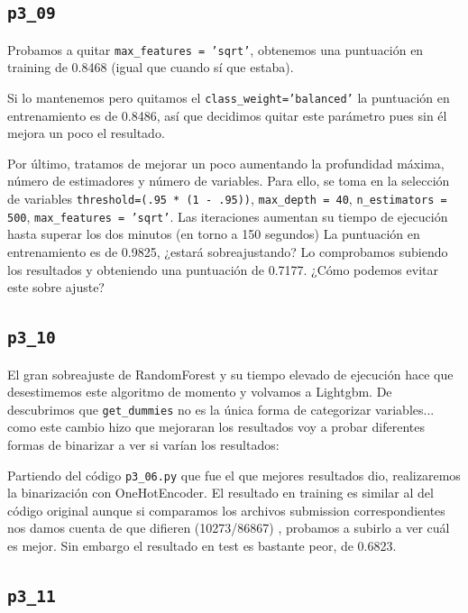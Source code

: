 \documentclass[a4paper, 20pt]{article}
\begin{document}
\subsection{\texttt{p3\_09}}
Probamos a quitar \texttt{max\_features = 'sqrt'}, obtenemos una puntuación en training de 0.8468 (igual que cuando sí que estaba).

Si lo mantenemos pero quitamos el \texttt{class\_weight='balanced'} la puntuación en entrenamiento es de 0.8486, así que decidimos quitar este parámetro pues sin él mejora un poco el resultado.

Por último, tratamos de mejorar un poco aumentando la profundidad máxima, número de estimadores y número de variables. Para ello, se toma en la selección de variables \texttt{threshold=(.95 * (1 - .95))}, \texttt{max\_depth = 40}, \texttt{n\_estimators = 500}, \texttt{max\_features = 'sqrt'}. Las iteraciones aumentan su tiempo de ejecución hasta superar los dos minutos (en torno a 150 segundos) La puntuación en entrenamiento es de 0.9825, ¿estará sobreajustando? Lo comprobamos subiendo los resultados y obteniendo una puntuación de 0.7177. ¿Cómo podemos evitar este sobre ajuste?

\subsection{\texttt{p3\_10}}

El gran sobreajuste de RandomForest y su tiempo elevado de ejecución hace que desestimemos este algoritmo de momento y volvamos a Lightgbm.
De %
descubrimos que \texttt{get\_dummies} no es la única forma de categorizar variables... como este cambio hizo que mejoraran los resultados voy a probar diferentes formas de binarizar a ver si varían los resultados:

Partiendo del código \texttt{p3\_06.py} que fue el que mejores resultados dio, realizaremos la binarización con OneHotEncoder.
El resultado en training es similar al del código original aunque si comparamos los archivos submission correspondientes nos damos cuenta de que difieren (10273/86867)
, probamos a subirlo a ver cuál es mejor. Sin embargo el resultado en test es bastante peor, de 0.6823.

\subsection{\texttt{p3\_11}}
\end{document}
